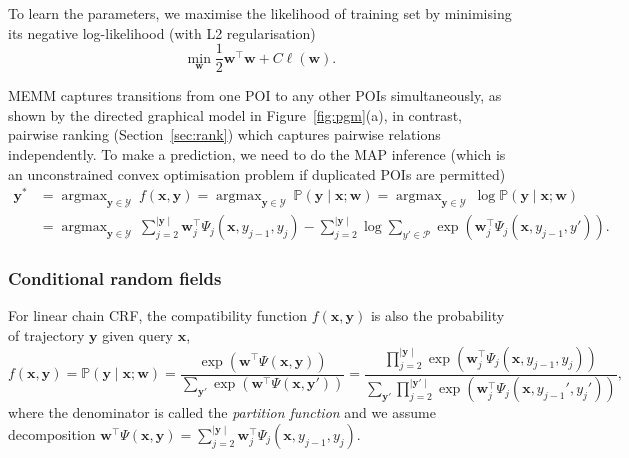 \documentclass[9pt]{extarticle}
\DeclareMathOperator*{\argmax}{argmax}
\begin{document}
To learn the parameters, we maximise the likelihood of training set by minimising its negative log-likelihood (with L2 regularisation)
\begin{equation}
\label{eq:trainmemm}
\min_{\mathbf{w}} \frac{1}{2} \mathbf{w}^\top \mathbf{w} + C \ell(\mathbf{w}).
\end{equation}

MEMM captures transitions from one POI to any other POIs simultaneously, as shown by the directed graphical model in Figure~\ref{fig:pgm}(a),
in contrast, pairwise ranking (Section~\ref{sec:rank}) which captures pairwise relations independently.
To make a prediction, we need to do the MAP inference (which is an unconstrained convex optimisation problem if duplicated POIs are permitted)
\begin{equation}
\label{eq:testmemm}
\begin{aligned}
\mathbf{y}^* 
&= \argmax_{\mathbf{y} \in \mathcal{Y}}~f(\mathbf{x}, \mathbf{y})
 = \argmax_{\mathbf{y} \in \mathcal{Y}}~\mathbb{P}(\mathbf{y} \mid \mathbf{x}; \mathbf{w})
 = \argmax_{\mathbf{y} \in \mathcal{Y}}~\log \mathbb{P}(\mathbf{y} \mid \mathbf{x}; \mathbf{w}) \\
&= \argmax_{\mathbf{y} \in \mathcal{Y}}~\sum_{j=2}^{\mid \mathbf{y} \mid} \mathbf{w}_j^\top \Psi_j(\mathbf{x}, y_{j-1}, y_j) - 
   \sum_{j=2}^{\mid \mathbf{y} \mid} \log \sum_{y' \in \mathcal{P}} \exp \left(\mathbf{w}_j^\top \Psi_j(\mathbf{x}, y_{j-1}, y') \right).
\end{aligned}
\end{equation}



\subsubsection{Conditional random fields}
\label{sec:crf}

For linear chain CRF, the compatibility function $f(\mathbf{x}, \mathbf{y})$ is also the probability of trajectory $\mathbf{y}$ given query $\mathbf{x}$,
\begin{equation*}
f(\mathbf{x}, \mathbf{y}) = \mathbb{P}(\mathbf{y} \mid \mathbf{x}; \mathbf{w}) 
= \frac{\exp \left( \mathbf{w}^\top \Psi(\mathbf{x}, \mathbf{y}) \right)}
       {\sum_{\mathbf{y}'} \exp \left( \mathbf{w}^\top \Psi(\mathbf{x}, \mathbf{y}') \right)}
= \frac{\prod_{j=2}^{\mid \mathbf{y} \mid} \exp \left( \mathbf{w}_j^\top \Psi_j(\mathbf{x}, y_{j-1}, y_j) \right)}
       {\sum_{\mathbf{y}'} \prod_{j=2}^{\mid \mathbf{y}' \mid} \exp \left( \mathbf{w}_j^\top \Psi_j(\mathbf{x}, y_{j-1}', y_j') \right)},
\end{equation*}
where the denominator is called the \emph{partition function} and we assume decomposition 
$\mathbf{w}^\top \Psi(\mathbf{x}, \mathbf{y}) = \sum_{j=2}^{\mid \mathbf{y} \mid} \mathbf{w}_j^\top \Psi_j(\mathbf{x}, y_{j-1}, y_j)$.
\end{document}
